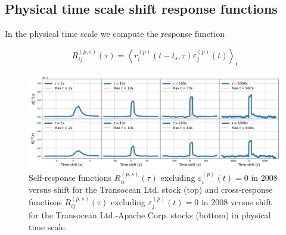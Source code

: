 \subsection{Physical time scale shift response functions}
\label{subsec:time_shift_physical}

In the physical time scale we compute the response function

\begin{equation}\label{eq:time_shift_physical}
    R_{ij}^{\left(p, s\right)}\left(\tau\right)=\left\langle r^{\left(p\right)}
    _{i} \left(t-t_{s},\tau\right) \varepsilon^{\left(p\right)}_{j}
    \left(t\right)\right\rangle _{t}
\end{equation}

\begin{figure}[htbp]
    \centering
    \includegraphics[width=\textwidth]{figures/04_shift_physical_RIG_APA.png}
    \caption{Self-response functions
             $R_{ii}^{\left(p, s\right)}\left(\tau\right)$ excluding
             $\varepsilon^{\left(p\right)}_{i}\left(t\right) = 0$ in 2008
             versus shift for the Transocean Ltd. stock (top) and
             cross-response functions
             $R_{ij}^{\left(p, s\right)}\left(\tau\right)$ excluding
             $\varepsilon^{\left(p\right)}_{j}\left(t\right) = 0$ in 2008
             versus shift for the Transocean Ltd.-Apache Corp. stocks (bottom)
             in physical time scale.}
    \label{fig:shift_physical_scale}
\end{figure}

